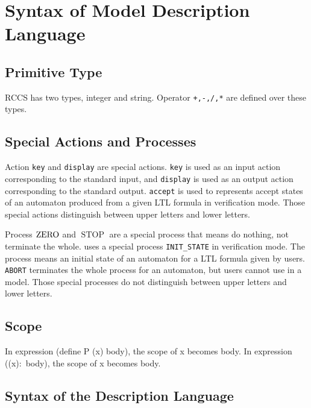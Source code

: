 \documentclass[12pt,a4paper,titlepage]{article}
\theoremstyle{break}
\begin{document}
\section{Syntax of Model Description Language}
\subsection{Primitive Type}
RCCS has two types, integer and string.
Operator {\tt +,-,/,*} are defined over these types.
\subsection{Special Actions and Processes}
Action {\tt key} and {\tt display} are special actions. 
{\tt key} is used as an input action corresponding to the standard input, and {\tt display} is used as an output action corresponding to the standard output.
{\tt accept} is used to represents accept states of an automaton produced from a given LTL formula in verification mode.
Those special actions distinguish between upper letters and lower letters.

Process \(\mathop{\mathrm{ZERO}}\nolimits\) and \({\mathop{\mathrm{STOP}}\nolimits}\) are a special process that means do nothing, not terminate the whole.
\NHK uses a special process {\tt INIT\_STATE} in verification mode.
The process means an initial state of an automaton for a LTL formula given by users.
{\tt ABORT} terminates the whole process for an automaton, but users cannot use in a model.
Those special processes do not distinguish between upper letters and lower letters.
\subsection{Scope}
In expression (define P (x) body), the scope of x becomes body.
In expression ((x)\(\colon\) body), the scope of x becomes body.
\subsection{Syntax of the Description Language}\label{sec:RCCSsyntax}

\end{document}
